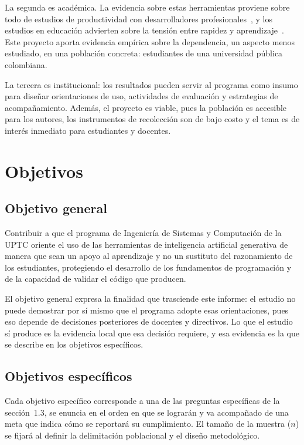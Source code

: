 \documentclass[12pt,a4paper,oneside]{report}
\begin{document}
La segunda es académica. La evidencia sobre estas herramientas proviene sobre todo de estudios de productividad con desarrolladores profesionales~\cite{peng2023}, y los estudios en educación advierten sobre la tensión entre rapidez y aprendizaje~\cite{prather2023,martinovic2024,ieee2024}. Este proyecto aporta evidencia empírica sobre la dependencia, un aspecto menos estudiado, en una población concreta: estudiantes de una universidad pública colombiana.

La tercera es institucional: los resultados pueden servir al programa como insumo para diseñar orientaciones de uso, actividades de evaluación y estrategias de acompañamiento. Además, el proyecto es viable, pues la población es accesible para los autores, los instrumentos de recolección son de bajo costo y el tema es de interés inmediato para estudiantes y docentes.

\chapter{Objetivos}

\section{Objetivo general}

Contribuir a que el programa de Ingeniería de Sistemas y Computación de la UPTC oriente el uso de las herramientas de inteligencia artificial generativa de manera que sean un apoyo al aprendizaje y no un sustituto del razonamiento de los estudiantes, protegiendo el desarrollo de los fundamentos de programación y de la capacidad de validar el código que producen.

El objetivo general expresa la finalidad que trasciende este informe: el estudio no puede demostrar por sí mismo que el programa adopte esas orientaciones, pues eso depende de decisiones posteriores de docentes y directivos. Lo que el estudio sí produce es la evidencia local que esa decisión requiere, y esa evidencia es la que se describe en los objetivos específicos.

\section{Objetivos específicos}

Cada objetivo específico corresponde a una de las preguntas específicas de la sección~1.3, se enuncia en el orden en que se lograrán y va acompañado de una meta que indica cómo se reportará su cumplimiento. El tamaño de la muestra ($n$) se fijará al definir la delimitación poblacional y el diseño metodológico.
\end{document}
